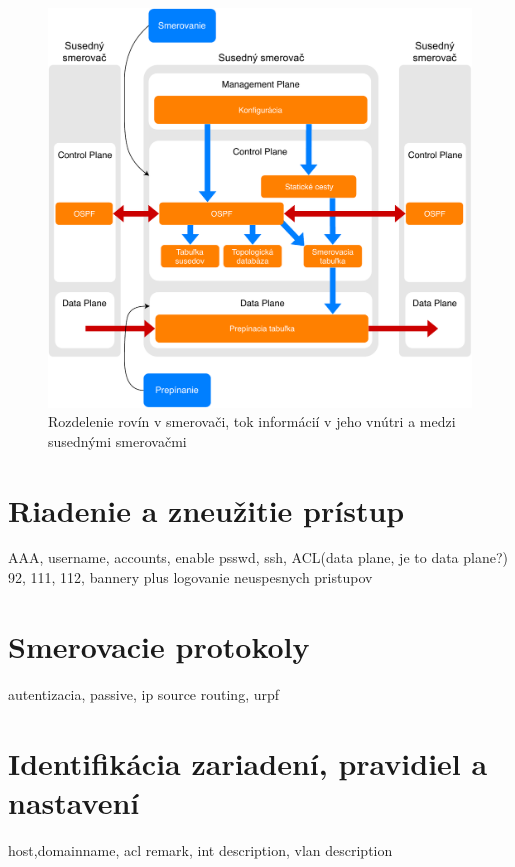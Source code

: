 \begin{figure}[H]
	\begin{center}
		\includegraphics[scale=0.6]{obrazky/SDN_planes.pdf}
	\end{center}
	\caption[Rozdelenie rovín v smerovači, tok informácií v jeho vnútri a medzi susednými smerovačmi]{Rozdelenie rovín v smerovači, tok informácií v jeho vnútri a medzi susednými smerovačmi \cite{Pepelnjak2013}}
	\label{sdn-planes}
\end{figure} 




\section{Riadenie a zneužitie prístup}
AAA, username, accounts, enable psswd, ssh, ACL(data plane, je to data plane?) 92, 111, 112, bannery plus logovanie neuspesnych pristupov

\section{Smerovacie protokoly}
autentizacia, passive, ip source routing, urpf


\section{Identifikácia zariadení, pravidiel a nastavení}
host,domainname, acl remark, int description, vlan description

